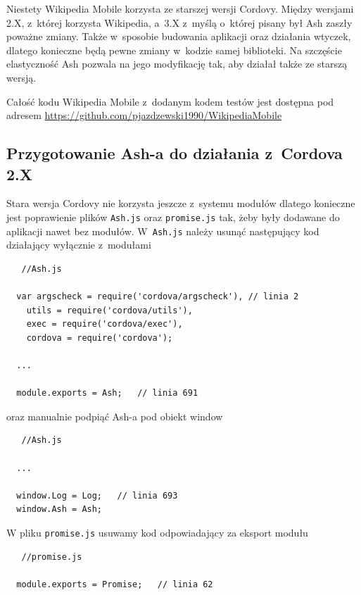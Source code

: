 \documentclass[brudnopis]{xmgr}
\begin{document}
Niestety Wikipedia Mobile korzysta ze starszej wersji Cordovy. Między wersjami 2.X, z~której korzysta Wikipedia, a~3.X z~myślą o~której pisany był Ash zaszły poważne zmiany. Także w~sposobie budowania aplikacji oraz działania wtyczek, dlatego konieczne będą pewne zmiany w~kodzie samej biblioteki. Na szczęście elastyczność Ash pozwala na jego modyfikację tak, aby działał także ze starszą wersją.

Całość kodu Wikipedia Mobile z~dodanym kodem testów jest dostępna pod adresem \url{https://github.com/pjazdzewski1990/WikipediaMobile} 

\subsection{Przygotowanie Ash-a do działania z~Cordova 2.X}
  
Stara wersja Cordovy nie korzysta jeszcze z~systemu modułów dlatego konieczne jest poprawienie plików \texttt{Ash.js} oraz \texttt{promise.js} tak, żeby były dodawane do aplikacji nawet bez modułów.  W~\texttt{Ash.js} należy usunąć następujący kod działający wyłącznie z~modułami

\begin{lstlisting}
   //Ash.js
  
  var argscheck = require('cordova/argscheck'), // linia 2
    utils = require('cordova/utils'),
    exec = require('cordova/exec'),
    cordova = require('cordova');

  ...

  module.exports = Ash;   // linia 691

\end{lstlisting}

oraz manualnie podpiąć Ash-a pod obiekt window

\begin{lstlisting}
   //Ash.js

  ...

  window.Log = Log;   // linia 693
  window.Ash = Ash;

\end{lstlisting}

W pliku \texttt{promise.js} usuwamy kod odpowiadający za eksport modułu

\begin{lstlisting}
   //promise.js
 
  module.exports = Promise;   // linia 62 

\end{lstlisting}
\end{document}
